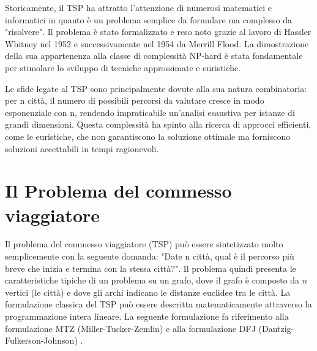 \documentclass[a4paper,12pt]{report}
\begin{document}
Storicamente, il TSP ha attratto l'attenzione di numerosi matematici e informatici in quanto è un problema semplice da formulare ma complesso da "risolvere". Il problema è stato formalizzato e reso noto grazie al lavoro di Hassler Whitney nel 1952 e successivamente nel 1954 da Merrill Flood. La dimostrazione della sua appartenenza alla classe di complessità NP-hard è stata fondamentale per stimolare lo sviluppo di tecniche approssimate e euristiche.

Le sfide legate al TSP sono principalmente dovute alla sua natura combinatoria: per n città, il numero di possibili percorsi da valutare cresce in modo esponenziale con n, rendendo impraticabile un'analisi esaustiva per istanze di grandi dimensioni. Questa complessità ha spinto alla ricerca di approcci efficienti, come le euristiche, che non garantiscono la soluzione ottimale ma forniscono soluzioni accettabili in tempi ragionevoli.

\chapter{Il Problema del commesso viaggiatore}
Il problema del commesso viaggiatore (TSP) può essere sintetizzato molto semplicemente con la seguente domanda: "Date n città, qual è il percorso più breve che inizia e termina con la stessa città?". Il problema quindi presenta le caratteristiche tipiche di un problema su un grafo, dove il grafo è composto da $n$ vertici (le città) e dove gli archi indicano le distanze euclidee tra le città. La formulazione classica del TSP può essere descritta matematicamente attraverso la programmazione intera lineare. La seguente formulazione fa riferimento alla formulazione MTZ (Miller-Tucker-Zemlin) e alla formulazione DFJ (Dantzig-Fulkerson-Johnson) \cite{TSP formulation}.
\end{document}
